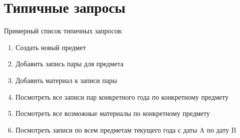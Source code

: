 \documentclass[a4paper,12pt]{article}
\begin{document}
\section*{Типичные запросы}
Примерный список типичных запросов:
\begin{enumerate}
\item Создать новый предмет

\item Добавить запись пары для предмета

\item Добавить материал к записи пары

\item Посмотреть все записи пар конкретного года по конкретному предмету

\item Посмотреть все возможные материалы по конкретному предмету

\item Посмотреть записи по всем предметам текущего года с даты A по дату B 

\end{enumerate}
\end{document}
